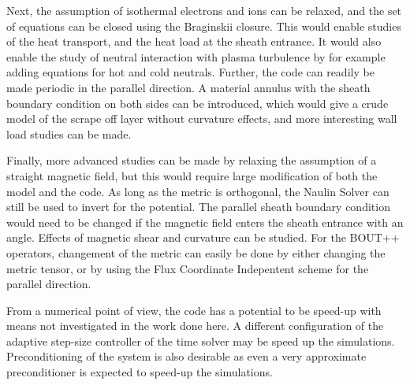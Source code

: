Next, the assumption of isothermal electrons and ions can be relaxed, and the set of equations can be closed using the Braginskii closure.
This would enable studies of the heat transport, and the heat load at the sheath entrance.
It would also enable the study of neutral interaction with plasma turbulence by for example adding equations for hot and cold neutrals.
Further, the code can readily be made periodic in the parallel direction.
A material annulus with the sheath boundary condition on both sides can be introduced, which would give a crude model of the scrape off layer without curvature effects, and more interesting wall load studies can be made.

Finally, more advanced studies can be made by relaxing the assumption of a straight magnetic field, but this would require large modification of both the model and the code.
As long as the metric is orthogonal, the Naulin Solver can still be used to invert for the potential.
The parallel sheath boundary condition would need to be changed if the magnetic field enters the sheath entrance with an angle.
Effects of magnetic shear and curvature can be studied.
For the BOUT++ operators, changement of the metric can easily be done by either changing the metric tensor, or by using the Flux Coordinate Indepentent scheme for the parallel direction.

From a numerical point of view, the code has a potential to be speed-up with means not investigated in the work done here.
A different configuration of the adaptive step-size controller of the time solver may be speed up the simulations.
Preconditioning of the system is also desirable as even a very approximate preconditioner is expected to speed-up the simulations.
